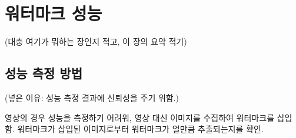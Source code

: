 
\chapter{워터마크 성능}

(대충 여기가 뭐하는 장인지 적고, 이 장의 요약 적기)

\section{성능 측정 방법}

(넣은 이유: 성능 측정 결과에 신뢰성을 주기 위함.)

영상의 경우 성능을 측정하기 어려워, 영상 대신 이미지를 수집하여 워터마크를
삽입함. 워터마크가 삽입된 이미지로부터 워터마크가 얼만큼 추출되는지를 확인.

